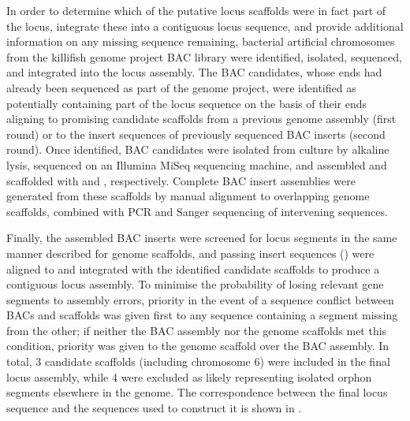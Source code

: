 In order to determine which of the putative locus scaffolds were in fact part of the \igh{} locus, integrate these into a contiguous locus sequence, and provide additional information on any missing sequence remaining, bacterial artificial chromosomes from the killifish genome project BAC library were identified, isolated, sequenced, and integrated into the locus assembly. The BAC candidates, whose ends had already been sequenced as part of the genome project, were identified as potentially containing part of the locus sequence on the basis of their ends aligning to promising candidate scaffolds from a previous genome assembly (first round) or to the insert sequences of previously sequenced BAC inserts (second round). Once identified,  BAC candidates were isolated from culture by alkaline lysis, sequenced on an Illumina MiSeq sequencing machine, and assembled and scaffolded with  and , respectively. Complete BAC insert assemblies were generated from these scaffolds by manual alignment to overlapping genome scaffolds, combined with PCR and Sanger sequencing of intervening sequences.

Finally, the assembled BAC inserts were screened for \igh{} locus segments in the same manner described for genome scaffolds, and passing insert sequences () were aligned to and integrated with the identified candidate scaffolds to produce a contiguous locus assembly. To minimise the probability of losing relevant gene segments to assembly errors, priority in the event of a sequence conflict between BACs and scaffolds was given first to any sequence containing a segment missing from the other; if neither the BAC assembly nor the genome scaffolds met this condition, priority was given to the genome scaffold over the BAC assembly. In total, 3 candidate scaffolds (including chromosome 6) were included in the final locus assembly, while 4 were excluded as likely representing isolated \igh{} orphon segments elsewhere in the genome. The correspondence between the final locus sequence and the sequences used to construct it is shown in . %

